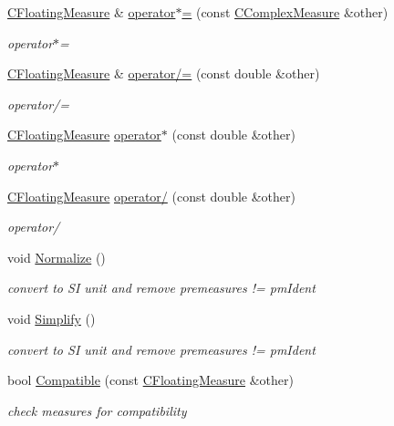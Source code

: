 \begin{DoxyCompactItemize}
\hyperlink{classCFloatingMeasure}{C\+Floating\+Measure} \& \hyperlink{classCFloatingMeasure_a076fc9e5cb2f4cf11932e520e0e1f20c}{operator$\ast$=} (const \hyperlink{classCComplexMeasure}{C\+Complex\+Measure} \&other)
\begin{DoxyCompactList}\small\item\em operator$\ast$= \end{DoxyCompactList}\item 
\hyperlink{classCFloatingMeasure}{C\+Floating\+Measure} \& \hyperlink{classCFloatingMeasure_a2ba332fa822922d51866e4361db1677b}{operator/=} (const double \&other)
\begin{DoxyCompactList}\small\item\em operator/= \end{DoxyCompactList}\item 
\hyperlink{classCFloatingMeasure}{C\+Floating\+Measure} \hyperlink{classCFloatingMeasure_a31cedd2120675c56064e12556432f550}{operator$\ast$} (const double \&other)
\begin{DoxyCompactList}\small\item\em operator$\ast$ \end{DoxyCompactList}\item 
\hyperlink{classCFloatingMeasure}{C\+Floating\+Measure} \hyperlink{classCFloatingMeasure_ac39b5a05cce42097d4439627aaaaf94c}{operator/} (const double \&other)
\begin{DoxyCompactList}\small\item\em operator/ \end{DoxyCompactList}\item 
void \hyperlink{classCFloatingMeasure_af4e2cc6a78b8e0cda11df432902bde8a}{Normalize} ()
\begin{DoxyCompactList}\small\item\em convert to SI unit and remove premeasures != pm\+Ident \end{DoxyCompactList}\item 
void \hyperlink{classCFloatingMeasure_a47731afb871889ee7da5f84b40e3a27f}{Simplify} ()
\begin{DoxyCompactList}\small\item\em convert to SI unit and remove premeasures != pm\+Ident \end{DoxyCompactList}\item 
bool \hyperlink{classCFloatingMeasure_ae69672971857cf047c5bc7ab4b631b6c}{Compatible} (const \hyperlink{classCFloatingMeasure}{C\+Floating\+Measure} \&other)
\begin{DoxyCompactList}\small\item\em check measures for compatibility \end{DoxyCompactList}\item 

\end{DoxyCompactItemize}
